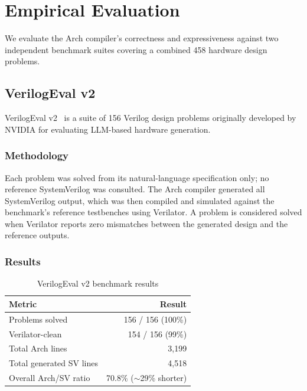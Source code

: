 \documentclass[manuscript]{acmart}
\begin{document}
\section{Empirical Evaluation}\label{sec:benchmark}

We evaluate the Arch compiler's correctness and expressiveness against two independent benchmark suites covering a combined 458 hardware design problems.

\subsection{VerilogEval v2}\label{sec:verilogeval}

VerilogEval v2~\cite{verilogeval} is a suite of 156 Verilog design problems originally developed by NVIDIA for evaluating LLM-based hardware generation.

\subsubsection{Methodology}

Each problem was solved from its natural-language specification only; no reference SystemVerilog was consulted. The Arch compiler generated all SystemVerilog output, which was then compiled and simulated against the benchmark's reference testbenches using Verilator. A problem is considered solved when Verilator reports zero mismatches between the generated design and the reference outputs.

\subsubsection{Results}

\begin{table}[H]
\centering
\caption{VerilogEval v2 benchmark results}
\label{tab:benchmark}
\small
\begin{tabular}{@{}lr@{}}
\toprule
\textbf{Metric} & \textbf{Result} \\
\midrule
Problems solved & 156 / 156 (100\%) \\
Verilator-clean & 154 / 156 (99\%) \\
Total Arch lines & 3,199 \\
Total generated SV lines & 4,518 \\
Overall Arch/SV ratio & 70.8\% (${\sim}$29\% shorter) \\
\bottomrule
\end{tabular}
\end{table}
\end{document}
